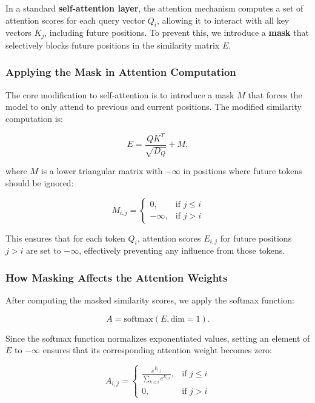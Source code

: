\noindent In a standard \textbf{self-attention layer}, the attention mechanism computes a set of attention scores for each query vector \( Q_i \), allowing it to interact with all key vectors \( K_j \), including future positions. To prevent this, we introduce a \textbf{mask} that selectively blocks future positions in the similarity matrix \( E \).

\subsubsection{Applying the Mask in Attention Computation}

\noindent The core modification to self-attention is to introduce a mask \( M \) that forces the model to only attend to previous and current positions. The modified similarity computation is:

\begin{equation}
    E = \frac{Q K^T}{\sqrt{D_Q}} + M,
\end{equation}

\noindent where \( M \) is a lower triangular matrix with \(-\infty\) in positions where future tokens should be ignored:

\[
M_{i,j} =
\begin{cases}
    0, & \text{if } j \leq i \\
    -\infty, & \text{if } j > i
\end{cases}
\]

\noindent This ensures that for each token \( Q_i \), attention scores \( E_{i,j} \) for future positions \( j > i \) are set to \(-\infty\), effectively preventing any influence from those tokens.

\subsubsection{How Masking Affects the Attention Weights}

\noindent After computing the masked similarity scores, we apply the softmax function:

\begin{equation}
    A = \text{softmax}(E, \text{dim}=1).
\end{equation}

\noindent Since the softmax function normalizes exponentiated values, setting an element of \( E \) to \(-\infty\) ensures that its corresponding attention weight becomes zero:

\[
A_{i,j} =
\begin{cases}
    \frac{e^{E_{i,j}}}{\sum_{k \leq i} e^{E_{i,k}}}, & \text{if } j \leq i \\
    0, & \text{if } j > i
\end{cases}
\]

